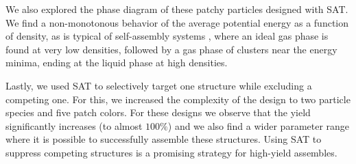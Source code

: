 \documentclass[a4paper, amsfonts, amssymb, amsmath, reprint, showkeys, nofootinbib, oneside]{revtex4-1}
\begin{document}
We also explored the phase diagram of these patchy particles designed with SAT. We find a non-monotonous behavior of the average potential energy as a function of density, as is typical of self-assembly systems \cite{Sciortino2009}, where an ideal gas phase is found at very low densities, followed by a gas phase of clusters near the energy minima, ending at the liquid phase at high densities.

Lastly, we used SAT to selectively target one structure while excluding a competing one. For this, we increased the complexity of the design to two particle species and five patch colors. For these designs we observe that the yield significantly increases (to almost $100\%$) and we also find a wider parameter range where it is possible to successfully assemble these structures. Using SAT to suppress competing structures is a promising strategy for high-yield assembles.

\end{document}
